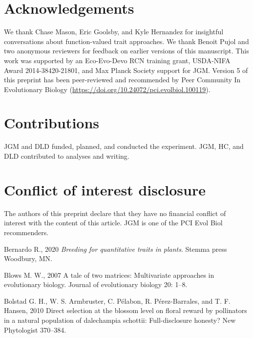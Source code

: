 \documentclass[jou,floatsintext]{apa6}
\begin{document}
\hypertarget{acknowledgements}{%
\section{Acknowledgements}\label{acknowledgements}}

We thank Chase Mason, Eric Goolsby, and Kyle Hernandez for insightful conversations about function-valued trait approaches. We thank Benoit Pujol and two anonymous reviewers for feedback on earlier versions of this manuscript. This work was supported by an Eco-Evo-Devo RCN training grant, USDA-NIFA Award 2014-38420-21801, and Max Planck Society support for JGM. Version 5 of this preprint has been peer-reviewed and recommended by Peer Community In Evolutionary Biology (\url{https://doi.org/10.24072/pci.evolbiol.100119}).

\hypertarget{contributions}{%
\section{Contributions}\label{contributions}}

JGM and DLD funded, planned, and conducted the experiment. JGM, HC, and DLD contributed to analyses and writing.

\hypertarget{conflict-of-interest-disclosure}{%
\section{Conflict of interest disclosure}\label{conflict-of-interest-disclosure}}

The authors of this preprint declare that they have no financial conflict of interest with the content of this article. JGM is one of the PCI Evol Biol recommenders.

\newpage

\begingroup
\setlength{\parindent}{-0.5in}
\setlength{\leftskip}{0.5in}

\hypertarget{refs}{}
\leavevmode\hypertarget{ref-bernardo2020breeding}{}%
Bernardo R., 2020 \emph{Breeding for quantitative traits in plants}. Stemma press Woodbury, MN.

\leavevmode\hypertarget{ref-blows2007tale}{}%
Blows M. W., 2007 A tale of two matrices: Multivariate approaches in evolutionary biology. Journal of evolutionary biology 20: 1--8.

\leavevmode\hypertarget{ref-bolstad2010direct}{}%
Bolstad G. H., W. S. Armbruster, C. Pélabon, R. Pérez-Barrales, and T. F. Hansen, 2010 Direct selection at the blossom level on floral reward by pollinators in a natural population of dalechampia schottii: Full-disclosure honesty? New Phytologist 370--384.
\end{document}
